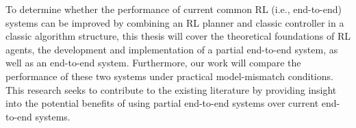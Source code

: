 To determine whether the performance of current common RL (i.e., end-to-end) systems can be improved by combining an RL planner and classic controller in a classic algorithm structure,
this thesis will cover the theoretical foundations of RL agents, the development and implementation of a partial end-to-end system, as well as an end-to-end system. 
Furthermore, our work will compare the performance of these two systems under practical model-mismatch conditions. 
This research seeks to contribute to the existing literature by providing insight into the potential benefits of using partial end-to-end systems over current end-to-end systems.






